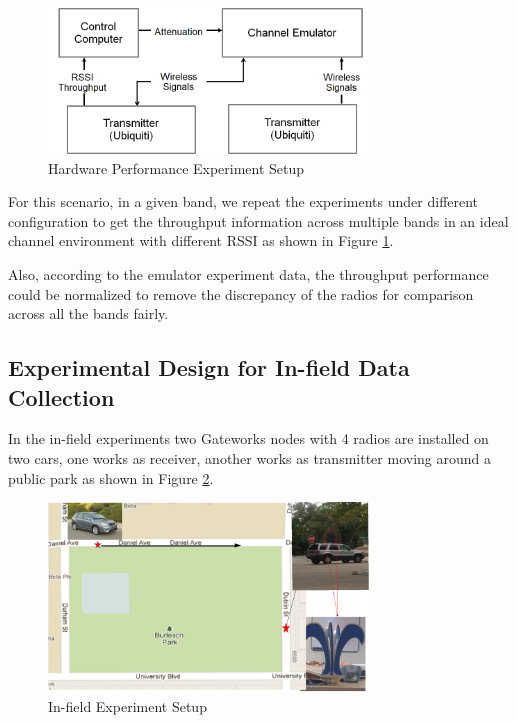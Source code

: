 \begin{figure}
\centering
\includegraphics[width=85mm]{figure/emulator2}
\caption{Hardware Performance Experiment Setup}
\label{fig:in-door experiment}
\end{figure}

For this scenario, in a given band, we repeat the experiments under different configuration to get the throughput information across multiple bands in an ideal channel environment with different RSSI as shown in Figure \ref{fig:in-door experiment}.

Also, according to the emulator experiment data, the throughput performance could be normalized to remove the discrepancy of the radios for comparison across all the bands fairly. 


\subsection{Experimental Design for In-field Data Collection}
\label{subsec:insitu}
In the in-field experiments two Gateworks nodes with 4 radios are installed on two cars, one works as receiver, another works as transmitter moving around a public park as shown in Figure \ref{fig:infield}.

\begin{figure}
\centering
\includegraphics[width=85mm]{figure/infield}
\caption{In-field Experiment Setup}
\label{fig:infield}
\end{figure}


